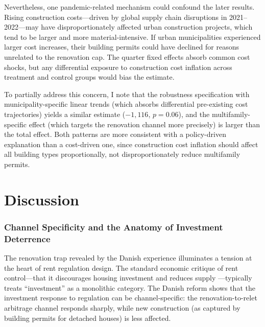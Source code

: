 \documentclass[12pt]{article}
\begin{document}
Nevertheless, one pandemic-related mechanism could confound the later results. Rising construction costs---driven by global supply chain disruptions in 2021--2022---may have disproportionately affected urban construction projects, which tend to be larger and more material-intensive. If urban municipalities experienced larger cost increases, their building permits could have declined for reasons unrelated to the renovation cap. The quarter fixed effects absorb common cost shocks, but any differential exposure to construction cost inflation across treatment and control groups would bias the estimate.

To partially address this concern, I note that the robustness specification with municipality-specific linear trends (which absorbs differential pre-existing cost trajectories) yields a similar estimate ($-1,116$, $p = 0.06$), and the multifamily-specific effect (which targets the renovation channel more precisely) is larger than the total effect. Both patterns are more consistent with a policy-driven explanation than a cost-driven one, since construction cost inflation should affect all building types proportionally, not disproportionately reduce multifamily permits.

\section{Discussion}

\subsubsection*{Channel Specificity and the Anatomy of Investment Deterrence} The renovation trap revealed by the Danish experience illuminates a tension at the heart of rent regulation design. The standard economic critique of rent control---that it discourages housing investment and reduces supply \citep{arnott1995,glaeser2003}---typically treats ``investment'' as a monolithic category. The Danish reform shows that the investment response to regulation can be channel-specific: the renovation-to-relet arbitrage channel responds sharply, while new construction (as captured by building permits for detached houses) is less affected.
\end{document}
